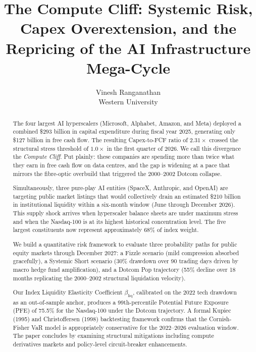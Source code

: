\documentclass[11pt]{article}
\title{\textbf{The Compute Cliff: Systemic Risk, Capex Overextension, and the Repricing of the AI Infrastructure Mega-Cycle}}
\author{Vinesh Ranganathan \\ Western University}
\newcommand{\betaliq}{\beta_{\text{liq}}}
\begin{document}
\maketitle

\begin{abstract}
The four largest AI hyperscalers (Microsoft, Alphabet, Amazon, and Meta) deployed a
combined \$293 billion in capital expenditure during fiscal year 2025, generating only
\$127 billion in free cash flow. The resulting Capex-to-FCF ratio of $2.31\times$ crossed
the structural stress threshold of $1.0\times$ in the first quarter of 2026. We call this
divergence the \textit{Compute Cliff}. Put plainly: these companies are spending more than
twice what they earn in free cash flow on data centres, and the gap is widening at a pace
that mirrors the fibre-optic overbuild that triggered the 2000--2002 Dotcom collapse.

Simultaneously, three pure-play AI entities (SpaceX, Anthropic, and OpenAI) are targeting
public market listings that would collectively drain an estimated \$210 billion in institutional
liquidity within a six-month window (June through December 2026). This supply shock arrives
when hyperscaler balance sheets are under maximum stress and when the Nasdaq-100 is at
its highest historical concentration level. The five largest constituents now represent
approximately 68\% of index weight.

We build a quantitative risk framework to evaluate three probability paths for public
equity markets through December 2027: a Fizzle scenario (mild compression absorbed
gracefully), a Systemic Short scenario (30\% drawdown over 90 trading days driven by
macro hedge fund amplification), and a Dotcom Pop trajectory (55\% decline over
18 months replicating the 2000--2002 structural liquidation velocity).

Our Index Liquidity Elasticity Coefficient $\betaliq$, calibrated on the 2022 tech
drawdown as an out-of-sample anchor, produces a 99th-percentile Potential Future
Exposure (PFE) of 75.5\% for the Nasdaq-100 under the Dotcom trajectory. A formal
Kupiec (1995) and Christoffersen (1998) backtesting framework confirms that the
Cornish-Fisher VaR model is appropriately conservative for the 2022--2026
evaluation window. The paper concludes by examining structural mitigations including
compute derivatives markets and policy-level circuit-breaker enhancements.
\end{abstract}

\clearpage
\tableofcontents
\clearpage
\end{document}

